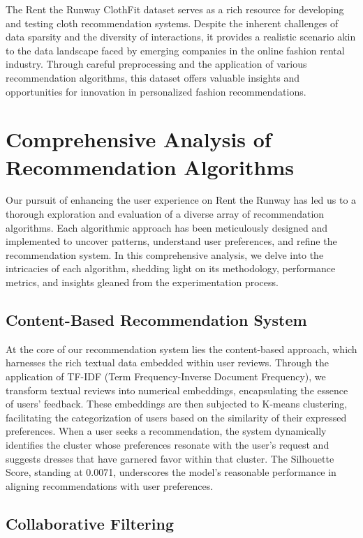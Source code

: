 \documentclass[conference]{IEEEtran}
\begin{document}
The Rent the Runway ClothFit dataset serves as a rich resource for developing and testing cloth recommendation systems. Despite the inherent challenges of data sparsity and the diversity of interactions, it provides a realistic scenario akin to the data landscape faced by emerging companies in the online fashion rental industry. Through careful preprocessing and the application of various recommendation algorithms, this dataset offers valuable insights and opportunities for innovation in personalized fashion recommendations.

\section{Comprehensive Analysis of Recommendation Algorithms}

Our pursuit of enhancing the user experience on Rent the Runway has led us to a thorough exploration and evaluation of a diverse array of recommendation algorithms. Each algorithmic approach has been meticulously designed and implemented to uncover patterns, understand user preferences, and refine the recommendation system. In this comprehensive analysis, we delve into the intricacies of each algorithm, shedding light on its methodology, performance metrics, and insights gleaned from the experimentation process.

\subsection{Content-Based Recommendation System}

At the core of our recommendation system lies the content-based approach, which harnesses the rich textual data embedded within user reviews. Through the application of TF-IDF (Term Frequency-Inverse Document Frequency), we transform textual reviews into numerical embeddings, encapsulating the essence of users' feedback. These embeddings are then subjected to K-means clustering, facilitating the categorization of users based on the similarity of their expressed preferences. When a user seeks a recommendation, the system dynamically identifies the cluster whose preferences resonate with the user's request and suggests dresses that have garnered favor within that cluster. The Silhouette Score, standing at 0.0071, underscores the model's reasonable performance in aligning recommendations with user preferences.

\subsection{Collaborative Filtering}
\end{document}
